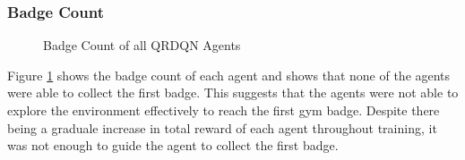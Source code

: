 \subsubsection*{Badge Count}

\begin{figure}[H]
    \centering
    \caption{Badge Count of all QRDQN Agents}
    \label{fig:QRDQN_badge_count}
\end{figure}

Figure \ref{fig:QRDQN_badge_count} shows the badge count of each agent and shows that none of the agents were able to collect the first badge. This suggests that the agents were not able to explore the environment effectively to reach the first gym badge. Despite there being a graduale increase in total reward of each agent throughout training, it was not enough to guide the agent to collect the first badge. 

